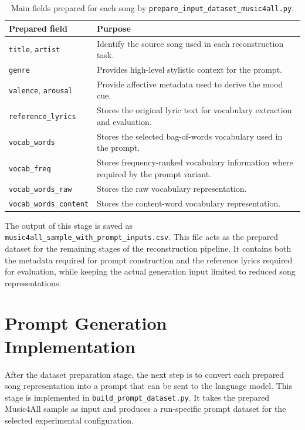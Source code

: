 \begin{table}[H]
\centering
\renewcommand{\arraystretch}{1.2}
\caption{Main fields prepared for each song by \texttt{prepare\_input\_dataset\_music4all.py}.}
\label{tab:dataset_prepared_fields}
\begin{tabular}{
>{\raggedright\arraybackslash}p{}
>{\raggedright\arraybackslash}p{}
}
\hline
Prepared field & Purpose \\
\hline
\texttt{title}, \texttt{artist} & Identify the source song used in each reconstruction task. \\
\texttt{genre} & Provides high-level stylistic context for the prompt. \\
\texttt{valence}, \texttt{arousal} & Provide affective metadata used to derive the mood cue. \\
\texttt{reference\_lyrics} & Stores the original lyric text for vocabulary extraction and evaluation. \\
\texttt{vocab\_words} & Stores the selected bag-of-words vocabulary used in the prompt. \\
\texttt{vocab\_freq} & Stores frequency-ranked vocabulary information where required by the prompt variant. \\
\texttt{vocab\_words\_raw} & Stores the raw vocabulary representation. \\
\texttt{vocab\_words\_content} & Stores the content-word vocabulary representation. \\
\hline
\end{tabular}
\renewcommand{\arraystretch}{1.0}
\end{table}

The output of this stage is saved as \texttt{music4all\_sample\_with\_prompt\_inputs.csv}. This file acts as the prepared dataset for the remaining stages of the reconstruction pipeline. It contains both the metadata required for prompt construction and the reference lyrics required for evaluation, while keeping the actual generation input limited to reduced song representations.

\section{Prompt Generation Implementation}

After the dataset preparation stage, the next step is to convert each prepared song representation into a prompt that can be sent to the language model. This stage is implemented in \texttt{build\_prompt\_dataset.py}. It takes the prepared Music4All sample as input and produces a run-specific prompt dataset for the selected experimental configuration.

